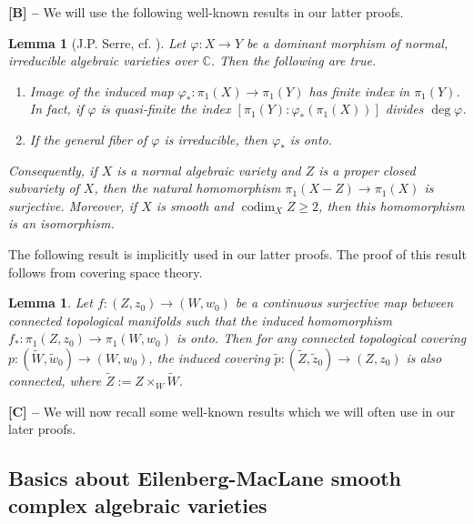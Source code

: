 \documentclass[12pt,reqno,twoside]{amsart}
\newtheorem{lemma}[theorem]{Lemma}
\theoremstyle{definition}
\numberwithin{equation}{section}
\newcommand{\C}{\mathbb{C}}
\newcommand{\wt}{\widetilde}
\newcommand{\codim}{\operatorname{codim}}
\begin{document}
\medskip

{\bf [B] --} We will use the following well-known results in our latter proofs.
	
\begin{lemma}[J.P. Serre, cf. \cite{Ser1959}]\label{Lem: surjective induced map at the level of pi_1}
	Let $\varphi:X \to Y$ be a dominant morphism of normal, irreducible algebraic varieties over $\C$. Then the following are true.
	\begin{enumerate}
		\item[\rm (1)] Image of the induced map $\varphi_*:\pi_1(X) \to \pi_1(Y)$ has finite index in $\pi_1(Y)$. In fact, if $\varphi$ is quasi-finite the index $[\pi_1(Y):\varphi_*(\pi_1(X))]$ divides $\deg \varphi$.
		\item[\rm (2)] If the general fiber of $\varphi$ is irreducible, then $\varphi_*$ is onto.
	\end{enumerate}
	Consequently, if $X$ is a normal algebraic variety and $Z$ is a proper closed subvariety of $X$, then the natural homomorphism $\pi_1(X-Z) \to \pi_1(X)$ is surjective. Moreover, if $X$ is smooth and $\codim_X Z \geq 2$, then this homomorphism is an isomorphism.
\end{lemma}

The following result is implicitly used in our latter proofs. The proof of this result follows from covering space theory.

\begin{lemma}\label{Lem: Pull-back of connected covering}
	Let $f: (Z,z_0) \to (W,w_0)$ be a continuous surjective map between connected topological manifolds such that the induced homomorphism $f_\ast:\pi_1(Z,z_0) \to \pi_1(W,w_0)$ is onto. Then for any connected topological covering $p:(\wt{W}, \wt{w}_0) \to (W,w_0)$, the induced covering $\wt{p}:(\wt{Z}, \wt{z}_0) \to (Z,z_0)$ is also connected, where $\wt{Z}:=Z\times_{W}\wt{W}$.
\end{lemma}

\medskip

{\bf [C] --} We will now recall some well-known results which we will often use in our later proofs.
\subsection{Basics about Eilenberg-MacLane smooth complex algebraic varieties}
\end{document}
